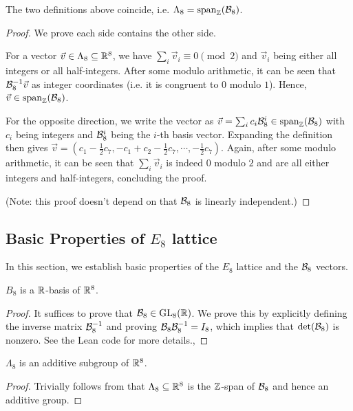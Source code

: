 \begin{theorem}\label{E8-defs-equivalent}\leanok
  The two definitions above coincide, i.e. $\Lambda_8 = \mathrm{span}_{\mathbb{Z}}(\mathcal{B}_8)$.
\end{theorem}
\begin{proof}
  We prove each side contains the other side.

  For a vector $\vec{v} \in \Lambda_8 \subseteq \mathbb{R}^8$, we have $\sum_i \vec{v}_i \equiv 0 \pmod{2}$ and $\vec{v}_i$ being either all integers or all half-integers. After some modulo arithmetic, it can be seen that $\mathcal{B}_8^{-1}\vec{v}$ as integer coordinates (i.e. it is congruent to $0$ modulo $1$). Hence, $\vec{v} \in \mathrm{span}_{\mathbb{Z}}(\mathcal{B}_8)$.

  For the opposite direction, we write the vector as $\vec{v} = \sum_i c_i\mathcal{B}_8^i \in \mathrm{span}_{\mathbb{Z}}(\mathcal{B}_8)$ with $c_i$ being integers and $\mathcal{B}_8^i$ being the $i$-th basis vector. Expanding the definition then gives $\vec{v} = \left(c_1 - \frac{1}{2}c_7, -c_1 + c_2 - \frac{1}{2}c_7, \cdots, -\frac{1}{2}c_7\right)$. Again, after some modulo arithmetic, it can be seen that $\sum_i \vec{v}_i$ is indeed $0$ modulo $2$ and are all either integers and half-integers, concluding the proof.

  (Note: this proof doesn't depend on that $\mathcal{B}_8$ is linearly independent.)
\end{proof}

\subsection{Basic Properties of $E_8$ lattice}

In this section, we establish basic properties of the $E_8$ lattice and the $\mathcal{B}_8$ vectors.

\begin{lemma}\label{E8-is-basis}\leanok
  $B_8$ is a $\mathbb{R}$-basis of $\mathbb{R}^8$.
\end{lemma}
\begin{proof}
  It suffices to prove that $\mathcal{B}_8 \in \mathrm{GL}_8(\mathbb{R})$. We prove this by explicitly defining the inverse matrix $\mathcal{B}_8^{-1}$ and proving $\mathcal{B}_8 \mathcal{B}_8^{-1} = I_8$, which implies that $\det(\mathcal{B}_8)$ is nonzero. See the Lean code for more details.,
\end{proof}

\begin{lemma}\label{E8-Lattice}\leanok
  $\Lambda_8$ is an additive subgroup of $\mathbb{R}^8$.
\end{lemma}
\begin{proof}\leanok
  Trivially follows from that $\Lambda_8 \subseteq \mathbb{R}^8$ is the $\mathbb{Z}$-span of $\mathcal{B}_8$ and hence an additive group.
\end{proof}


